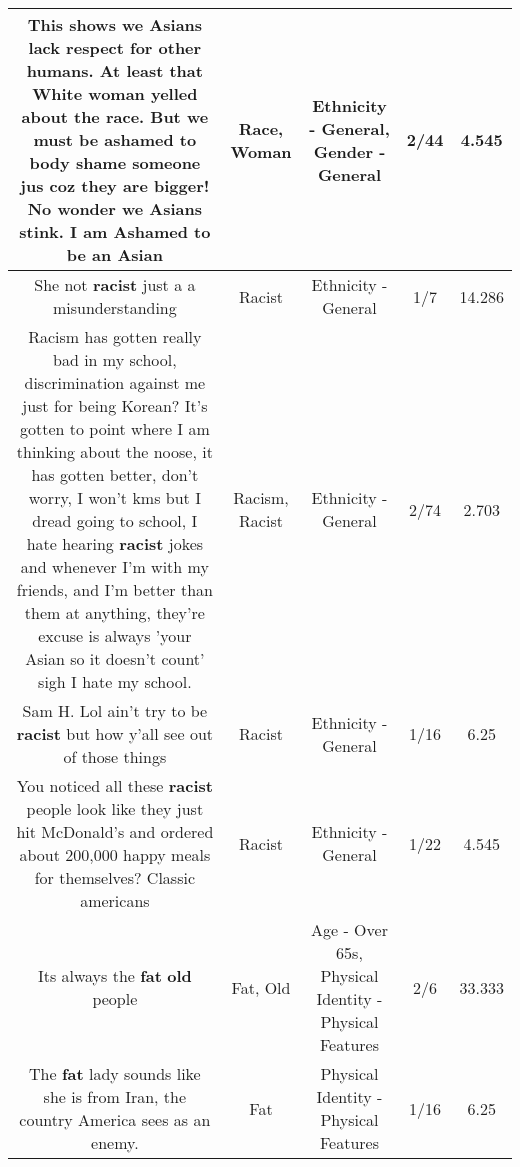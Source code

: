 \documentclass[11pt]{article}
\newlength\mylength
\begin{document}
\begin{center}
\begin{longtable}{|C{.65\mylength}|C{.30\mylength}|C{.12\mylength}|C{.12\mylength}|C{.12\mylength}|}
  \small This shows we Asians lack respect for other humans. At least that White \textbf{woman} yelled about the \textbf{race}. But we must be ashamed to body shame someone jus coz they are bigger! No wonder we Asians stink. I am Ashamed to be an Asian\normalsize   & Race, Woman & Ethnicity - General, Gender - General & 2/44 & 4.545 \\  \hline
  \small She not \textbf{racist} just a a misunderstanding\normalsize   & Racist & Ethnicity - General & 1/7 & 14.286 \\  \hline
  \small Racism has gotten really bad in my school, discrimination against me just for being Korean? It's gotten to point where I am thinking about the noose, it has gotten better, don't worry, I won't kms but I dread going to school, I hate hearing \textbf{racist} jokes and whenever I'm with my friends, and I'm better than them at anything, they're excuse is always 'your Asian so it doesn't count' sigh I hate my school.\normalsize   & Racism, Racist & Ethnicity - General & 2/74 & 2.703 \\  \hline
  \small Sam H. Lol ain't try to be \textbf{racist} but how y'all see out of those things\normalsize   & Racist & Ethnicity - General & 1/16 & 6.25 \\  \hline
  \small You noticed all these \textbf{racist} people look like they just hit McDonald's and ordered about 200,000 happy meals for themselves? Classic americans\normalsize   & Racist & Ethnicity - General & 1/22 & 4.545 \\  \hline
  \small Its always the \textbf{fat} \textbf{old} people\normalsize   & Fat, Old & Age - Over 65s, Physical Identity - Physical Features & 2/6 & 33.333 \\  \hline
  \small The \textbf{fat} lady sounds like she is from Iran, the country America sees as an enemy.\normalsize   & Fat & Physical Identity - Physical Features & 1/16 & 6.25 \\  \hline

\end{longtable}
\end{center}
\end{document}
